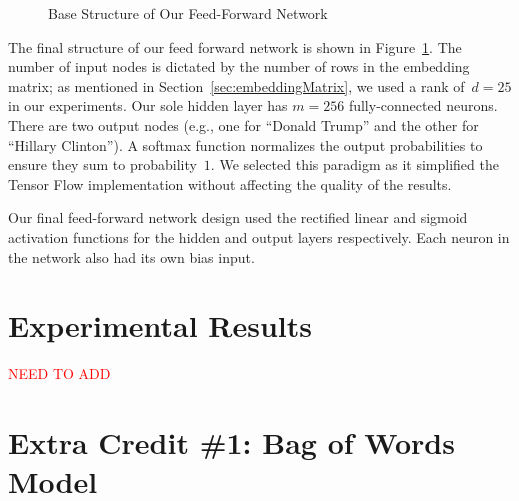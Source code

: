 \documentclass{report}
\begin{document}
\begin{figure}
    \caption{Base Structure of Our Feed-Forward Network}\label{fig:feedForwardNet}
  \end{figure}
  
  The final structure of our feed forward network is shown in Figure~\ref{fig:feedForwardNet}.  The number of input nodes is dictated by the number of rows in the embedding matrix; as mentioned in Section~\ref{sec:embeddingMatrix}, we used a rank of~$d=25$ in our experiments.  Our sole hidden layer has $m=256$ fully-connected neurons. There are two output nodes (e.g., one for ``Donald Trump'' and the other for ``Hillary Clinton'').  A softmax function normalizes the output probabilities to ensure they sum to probability~$1$.  We selected this paradigm as it simplified the Tensor Flow implementation without affecting the quality of the results.
  
  Our final feed-forward network design used the rectified linear and sigmoid activation functions for the hidden and output layers respectively.  Each neuron in the network also had its own bias input.
  
  \section{Experimental Results} \label{sec:experimentalResults}
  
  {\textcolor{red}{\Large NEED TO ADD}}
  
  \section{Extra Credit \#1: Bag of Words Model}
  
\end{document}
